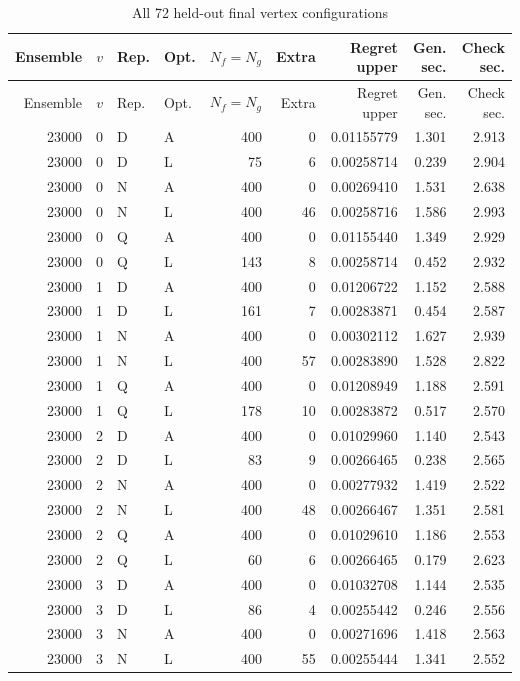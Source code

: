 \small\begin{longtable}{rrllrrrrr}
\caption{All 72 held-out final vertex configurations}\label{tab:r23ledger}\\
\toprule
Ensemble & $v$ & Rep. & Opt. & $N_f=N_g$ & Extra & Regret upper & Gen. sec. & Check sec.\\\midrule\endfirsthead
\toprule
Ensemble & $v$ & Rep. & Opt. & $N_f=N_g$ & Extra & Regret upper & Gen. sec. & Check sec.\\\midrule\endhead
23000 & 0 & D & A & 400 & 0 & 0.01155779 & 1.301 & 2.913\\
23000 & 0 & D & L & 75 & 6 & 0.00258714 & 0.239 & 2.904\\
23000 & 0 & N & A & 400 & 0 & 0.00269410 & 1.531 & 2.638\\
23000 & 0 & N & L & 400 & 46 & 0.00258716 & 1.586 & 2.993\\
23000 & 0 & Q & A & 400 & 0 & 0.01155440 & 1.349 & 2.929\\
23000 & 0 & Q & L & 143 & 8 & 0.00258714 & 0.452 & 2.932\\
23000 & 1 & D & A & 400 & 0 & 0.01206722 & 1.152 & 2.588\\
23000 & 1 & D & L & 161 & 7 & 0.00283871 & 0.454 & 2.587\\
23000 & 1 & N & A & 400 & 0 & 0.00302112 & 1.627 & 2.939\\
23000 & 1 & N & L & 400 & 57 & 0.00283890 & 1.528 & 2.822\\
23000 & 1 & Q & A & 400 & 0 & 0.01208949 & 1.188 & 2.591\\
23000 & 1 & Q & L & 178 & 10 & 0.00283872 & 0.517 & 2.570\\
23000 & 2 & D & A & 400 & 0 & 0.01029960 & 1.140 & 2.543\\
23000 & 2 & D & L & 83 & 9 & 0.00266465 & 0.238 & 2.565\\
23000 & 2 & N & A & 400 & 0 & 0.00277932 & 1.419 & 2.522\\
23000 & 2 & N & L & 400 & 48 & 0.00266467 & 1.351 & 2.581\\
23000 & 2 & Q & A & 400 & 0 & 0.01029610 & 1.186 & 2.553\\
23000 & 2 & Q & L & 60 & 6 & 0.00266465 & 0.179 & 2.623\\
23000 & 3 & D & A & 400 & 0 & 0.01032708 & 1.144 & 2.535\\
23000 & 3 & D & L & 86 & 4 & 0.00255442 & 0.246 & 2.556\\
23000 & 3 & N & A & 400 & 0 & 0.00271696 & 1.418 & 2.563\\
23000 & 3 & N & L & 400 & 55 & 0.00255444 & 1.341 & 2.552\\

\end{longtable}

